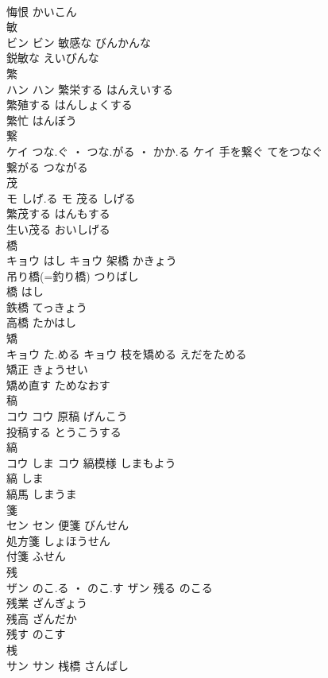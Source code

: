\documentclass[8pt]{extreport}
\begin{document}
\begin{CJK}{UTF8}{min}
\\	悔恨	かいこん	
\\	敏	
\\	ビン		ビン	敏感な	びんかんな	
\\	鋭敏な	えいびんな	
\\	繁	
\\	ハン		ハン	繁栄する	はんえいする	
\\	繁殖する	はんしょくする	
\\	繁忙	はんぼう	
\\	繋	
\\	ケイ	つな.ぐ ・ つな.がる ・ かか.る	ケイ	手を繋ぐ	てをつなぐ	
\\	繋がる	つながる	
\\	茂	
\\	モ	しげ.る	モ	茂る	しげる	
\\	繁茂する	はんもする	
\\	生い茂る	おいしげる	
\\	橋	
\\	キョウ	はし	キョウ	架橋	かきょう	
\\	吊り橋(=釣り橋)	つりばし	
\\	橋	はし	
\\	鉄橋	てっきょう	
\\	高橋	たかはし	
\\	矯	
\\	キョウ	た.める	キョウ	枝を矯める	えだをためる	
\\	矯正	きょうせい	
\\	矯め直す	ためなおす	
\\	稿	
\\	コウ		コウ	原稿	げんこう	
\\	投稿する	とうこうする	
\\	縞	
\\	コウ	しま	コウ	縞模様	しまもよう	
\\	縞	しま	
\\	縞馬	しまうま	
\\	箋	
\\	セン		セン	便箋	びんせん	
\\	処方箋	しょほうせん	
\\	付箋	ふせん	
\\	残	
\\	ザン	のこ.る ・ のこ.す	ザン	残る	のこる	
\\	残業	ざんぎょう	
\\	残高	ざんだか	
\\	残す	のこす	
\\	桟	
\\	サン		サン	桟橋	さんばし	

\end{CJK}
\end{document}
